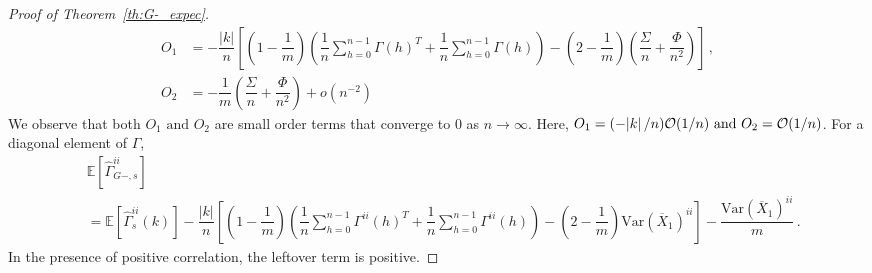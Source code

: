 \documentclass[11pt]{article}
\newcommand{\E}{\mathbb{E}}
\newcommand{\Var}{\text{Var}}
\theoremstyle{remark}
\begin{document}
\begin{proof}[Proof of Theorem~\ref{th:G-_expec}]
\begin{align*}
    O_1 &= -\dfrac{|k|}{n}\left[\left(1-\dfrac{1}{m}\right)\left(\dfrac{1}{n}\sum_{h=0}^{n-1}\Gamma(h)^T + \dfrac{1}{n}\sum_{h=0}^{n-1}\Gamma(h)\right) - \left(2-\dfrac{1}{m}\right) \left(\dfrac{\Sigma}{n} + \dfrac{\Phi}{n^2}\right)\right] \, ,\\
    O_2 &= -\dfrac{1}{m}\left(\dfrac{\Sigma}{n} + \dfrac{\Phi}{n^2}\right) + o(n^{-2})
\end{align*}
%
We observe that both $O_1 \textrm{ and } O_2$ are small order terms that converge to 0 as $n \to \infty$. Here, $O_1 = (-\abs{k}/n)\mathcal{O}(1/n) \textrm{ and } O_2 = \mathcal{O}(1/n)$. For a diagonal element of $\Gamma$,
%
\begin{align*}
& \E \left[ \hat{\Gamma}_{G-,s}^{ii}\right]\\
& = \mathbb{E}\left[\hat{\Gamma}^{ii}_{s}(k)\right] - \dfrac{|k|}{n}\left[\left(1-\dfrac{1}{m}\right)\left(\dfrac{1}{n}\sum_{h=0}^{n-1}\Gamma^{ii}(h)^T + \dfrac{1}{n}\sum_{h=0}^{n-1}\Gamma^{ii}(h)\right) - \left(2-\dfrac{1}{m}\right) \Var(\overline{X}_1)^{ii}\right] - \dfrac{\Var(\overline{X}_1)^{ii}}{m}\,.
\end{align*}
In the presence of positive correlation, the leftover term is positive.
\end{proof}
\end{document}
